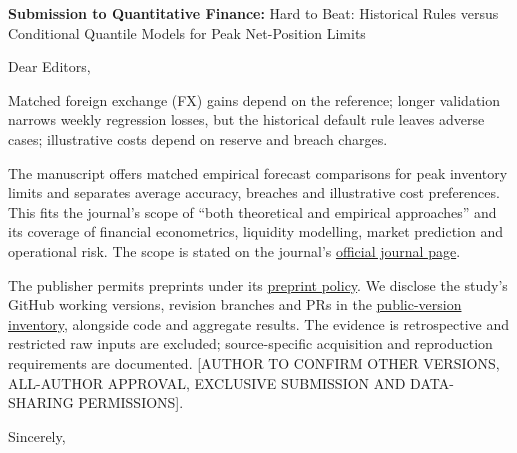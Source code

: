 \documentclass[11pt,a4paper]{article}
\begin{document}
\textbf{Submission to Quantitative Finance:} Hard to Beat: Historical Rules versus Conditional Quantile Models for Peak Net-Position Limits

Dear Editors,

Matched foreign exchange (FX) gains depend on the reference; longer validation narrows weekly regression losses, but the historical default rule leaves adverse cases; illustrative costs depend on reserve and breach charges.

The manuscript offers matched empirical forecast comparisons for peak inventory limits and separates average accuracy, breaches and illustrative cost preferences. This fits the journal's scope of ``both theoretical and empirical approaches'' and its coverage of financial econometrics, liquidity modelling, market prediction and operational risk. The scope is stated on the journal's \href{https://www.tandfonline.com/journals/rquf20/about-this-journal}{official journal page}.

The publisher permits preprints under its \href{https://authorservices.taylorandfrancis.com/publishing-your-research/making-your-submission/posting-to-a-preprint-server/}{preprint policy}. We disclose the study's GitHub working versions, revision branches and PRs in the \href{https://github.com/ByronLi0207/financial-mathematics-paper-20261020/blob/submission-final/notes/submission/public-versions.md}{public-version inventory}, alongside code and aggregate results. The evidence is retrospective and restricted raw inputs are excluded; source-specific acquisition and reproduction requirements are documented. [AUTHOR TO CONFIRM OTHER VERSIONS, ALL-AUTHOR APPROVAL, EXCLUSIVE SUBMISSION AND DATA-SHARING PERMISSIONS].

Sincerely,\par [TO BE COMPLETED BY AUTHOR]
\end{document}
